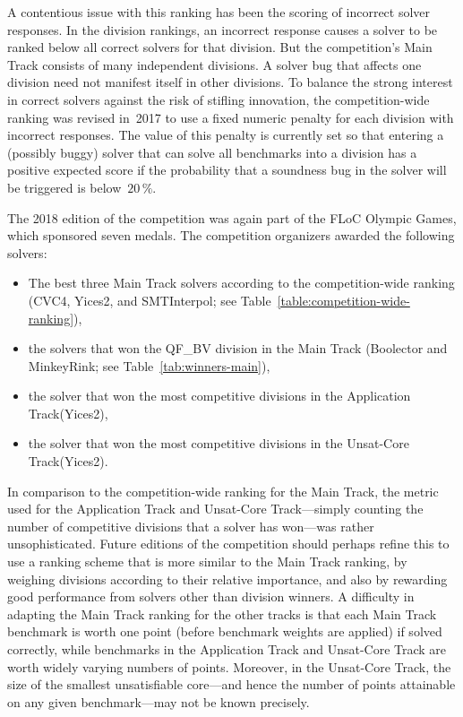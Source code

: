 \documentclass[dvipsnames,table,twoside,11pt]{article}
\newcommand{\maintrack}{Main Track\xspace}
\newcommand{\apptrack}{Application Track\xspace}
\newcommand{\ucoretrack}{Unsat-Core Track\xspace}
\begin{document}
A contentious issue with this ranking has been the scoring of
incorrect solver responses.  In the division rankings, an incorrect
response causes a solver to be ranked below all correct solvers for
that division.  But the competition's \maintrack consists of many
independent divisions.  A solver bug that affects one division need
not manifest itself in other divisions.  To balance the strong
interest in correct solvers against the risk of stifling innovation,
the competition-wide ranking was revised in~2017 to use a fixed
numeric penalty for each division with incorrect responses.  The value
of this penalty is currently set so that entering a (possibly buggy)
solver that can solve all benchmarks into a division has a positive
expected score if the probability that a soundness bug in the solver
will be triggered is below~$20\,\%$.~\cite{rules18}

The 2018 edition of the competition was again part of the FLoC Olympic
Games, which sponsored seven medals.  The competition organizers
awarded the following solvers:
\begin{itemize}
\item The best three \maintrack solvers according to the
  competition-wide ranking (CVC4, Yices2, and SMTInterpol; see
  Table~\ref{table:competition-wide-ranking}),
\item the solvers that won the QF\_BV division in the \maintrack 
  (Boolector and MinkeyRink; see Table~\ref{tab:winners-main}),
\item the solver that won the most competitive divisions in the
  \apptrack (Yices2),
\item the solver that won the most competitive divisions in the
  \ucoretrack (Yices2).
\end{itemize}

In comparison to the competition-wide ranking for the \maintrack, the
metric used for the \apptrack and \ucoretrack---simply counting
the number of competitive divisions that a solver has won---was rather
unsophisticated.  Future editions of the competition should perhaps
refine this to use a ranking scheme that is more similar to the
\maintrack ranking, by weighing divisions according to their relative
importance, and also by rewarding good performance from solvers other
than division winners.  A difficulty in adapting the \maintrack
ranking for the other tracks is that each \maintrack benchmark is
worth one point (before benchmark weights are applied) if solved
correctly, while benchmarks in the \apptrack and \ucoretrack
are worth widely varying numbers of points.  Moreover, in the
\ucoretrack, the size of the smallest unsatisfiable core---and
hence the number of points attainable on any given benchmark---may not
be known precisely.
\end{document}
